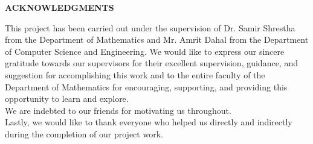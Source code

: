 



\begin{center}
	{\Large{\bf{ACKNOWLEDGMENTS}}}\\
\end{center}

\noindent

This project has been carried out under the supervision of Dr. Samir Shrestha from the Department of Mathematics and Mr. Amrit Dahal from the Department of Computer Science and Engineering. We would like to express our sincere gratitude towards our supervisors for their excellent supervision, guidance, and suggestion for accomplishing this work and to the entire faculty of the Department of Mathematics for encouraging, supporting, and providing this opportunity to learn and explore.\\

\noindent
We are indebted to our friends for motivating us throughout. \\

\noindent
Lastly, we would like to thank everyone who helped us directly and indirectly during the completion of our project work.



